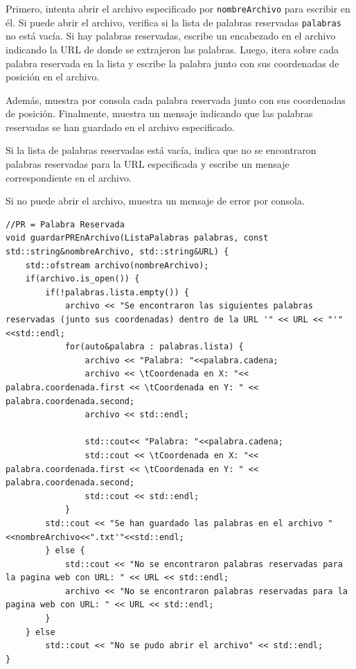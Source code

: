 \documentclass{article}
\begin{document}
        Primero, intenta abrir el archivo especificado por \texttt{nombreArchivo} para escribir en él. Si puede abrir el archivo, verifica
        si la lista de palabras reservadas \texttt{palabras} no está vacía. Si hay palabras reservadas, escribe un encabezado en el
        archivo indicando la URL de donde se extrajeron las palabras. Luego, itera sobre cada palabra reservada en la lista y escribe la
        palabra junto con sus coordenadas de posición en el archivo.

        Además, muestra por consola cada palabra reservada junto con sus coordenadas de posición. Finalmente, muestra un mensaje indicando
        que las palabras reservadas se han guardado en el archivo especificado.

        Si la lista de palabras reservadas está vacía, indica que no se encontraron palabras reservadas para la URL especificada y escribe
        un mensaje correspondiente en el archivo.

        Si no puede abrir el archivo, muestra un mensaje de error por consola.
            \begin{lstlisting}[caption={Archivo: \textit{solicitudesP04.cpp} | Funcion \texttt{guardarPREnArchivo}}, style=cppstyle, basicstyle=\ttfamily\footnotesize]
//PR = Palabra Reservada
void guardarPREnArchivo(ListaPalabras palabras, const std::string&nombreArchivo, std::string&URL) {
    std::ofstream archivo(nombreArchivo);
    if(archivo.is_open()) {
        if(!palabras.lista.empty()) {
            archivo << "Se encontraron las siguientes palabras reservadas (junto sus coordenadas) dentro de la URL '" << URL << "'"<<std::endl;
            for(auto&palabra : palabras.lista) {
                archivo << "Palabra: "<<palabra.cadena;
                archivo << \tCoordenada en X: "<< palabra.coordenada.first << \tCoordenada en Y: " << palabra.coordenada.second;
                archivo << std::endl;

                std::cout<< "Palabra: "<<palabra.cadena;
                std::cout << \tCoordenada en X: "<< palabra.coordenada.first << \tCoordenada en Y: " << palabra.coordenada.second;
                std::cout << std::endl;
            }
        std::cout << "Se han guardado las palabras en el archivo "<<nombreArchivo<<".txt'"<<std::endl;
        } else {
            std::cout << "No se encontraron palabras reservadas para la pagina web con URL: " << URL << std::endl;
            archivo << "No se encontraron palabras reservadas para la pagina web con URL: " << URL << std::endl;
        }
    } else
        std::cout << "No se pudo abrir el archivo" << std::endl;
}
            \end{lstlisting}
\end{document}
